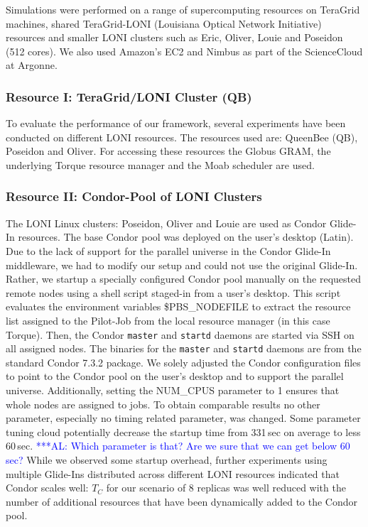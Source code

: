 \documentclass[conference,final]{IEEEtran}
\newcommand{\tc}{$T_{C}$ }
\newcommand{\alnote}[1]{ {\textcolor{blue} { ***AL: #1 }}}
\newcommand{\jhanote}[1]{ {\textcolor{red} { ***SJ: #1 }}}
\newcommand{\alnote}[1]{}
\newcommand{\jhanote}[1]{}
\begin{document}
Simulations were performed on a range of supercomputing resources on
TeraGrid machines, shared TeraGrid-LONI (Louisiana Optical Network
Initiative)~\cite{LONI_web} resources and smaller LONI clusters such
as Eric, Oliver, Louie and Poseidon (512 cores).  We also used
Amazon's EC2 and Nimbus as part of the ScienceCloud at Argonne.

\subsubsection*{Resource I: TeraGrid/LONI Cluster (QB)}

To evaluate the performance of our framework, several experiments 
have been conducted on different LONI resources. The resources used are: 
QueenBee (QB), Poseidon and Oliver. For accessing these resources
the Globus GRAM, the underlying Torque resource manager and the Moab scheduler are used.

\subsubsection*{Resource II: Condor-Pool of LONI Clusters}


The LONI Linux clusters: Poseidon, Oliver and Louie are used as Condor Glide-In 
resources. The base Condor pool was deployed on the user's desktop
(Latin). Due to the lack of support for the parallel universe in the
Condor Glide-In middleware, we had to modify our setup and could not
use the original Glide-In. Rather, we startup a specially configured 
Condor pool manually on the requested remote nodes using 
a shell script staged-in from a user's desktop. This script evaluates 
the environment variables \$PBS\_NODEFILE to extract the resource list assigned to
the Pilot-Job from the local resource manager (in this case Torque). Then, the 
Condor \texttt{master} and \texttt{startd} daemons are started 
via SSH on all assigned nodes. The binaries for the \texttt{master} and 
\texttt{startd} daemons are from the standard Condor 7.3.2 package. 
We solely adjusted the Condor configuration files to point to the Condor
pool on the user's desktop and to support the parallel universe.
Additionally, setting the NUM\_CPUS parameter to 1 ensures that 
whole nodes are assigned to jobs.
To obtain comparable results no other parameter, especially no timing related parameter, 
was changed. Some parameter tuning cloud potentially decrease the
startup time from 331\,sec on average to less 60\,sec. \alnote{Which parameter is that? Are
we sure that we can get below 60 sec?} While we observed
some startup overhead, further experiments using multiple Glide-Ins distributed
across different LONI resources indicated that Condor scales well: \tc for our
scenario of 8 replicas was well reduced with the number of additional resources that have
been dynamically added to the Condor pool. 
\end{document}
